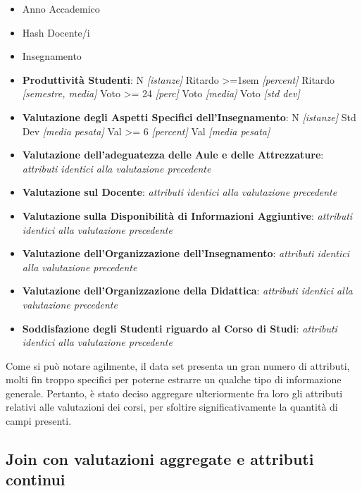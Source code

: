 		\begin{itemize}
			\item Anno Accademico
			\item Hash Docente/i
			\item Insegnamento
			\item \textbf{Produttività Studenti}:
				\subitem N \textit{[istanze]}
				\subitem Ritardo >=1sem \textit{[percent]}
				\subitem Ritardo \textit{[semestre, media]}
				\subitem Voto >= 24 \textit{[perc]}
				\subitem Voto \textit{[media]}
				\subitem Voto \textit{[std dev]}
			\item \textbf{Valutazione degli Aspetti Specifici dell'Insegnamento}:
				\subitem N \textit{[istanze]}
				\subitem Std Dev \textit{[media pesata]}
				\subitem Val >= 6 \textit{[percent]}
				\subitem Val \textit{[media pesata]}
			\item \textbf{Valutazione dell'adeguatezza delle Aule e delle Attrezzature}:
				\subitem \textit{attributi identici alla valutazione precedente}
			\item \textbf{Valutazione sul Docente}:
				\subitem \textit{attributi identici alla valutazione precedente}
			\item \textbf{Valutazione sulla Disponibilità di Informazioni Aggiuntive}:
				\subitem \textit{attributi identici alla valutazione precedente}
			\item \textbf{Valutazione dell'Organizzazione dell'Insegnamento}:
				\subitem \textit{attributi identici alla valutazione precedente}
			\item \textbf{Valutazione dell'Organizzazione della Didattica}:
				\subitem \textit{attributi identici alla valutazione precedente}
			\item \textbf{Soddisfazione degli Studenti riguardo al Corso di Studi}:
				\subitem \textit{attributi identici alla valutazione precedente}
		\end{itemize}

		Come si può notare agilmente, il data set presenta un gran numero di attributi, molti fin troppo specifici per poterne estrarre un qualche tipo di informazione generale. Pertanto, è stato deciso aggregare ulteriormente fra loro gli attributi relativi alle valutazioni dei corsi, per sfoltire significativamente la quantità di campi presenti.
		
	\subsection{Join con valutazioni aggregate e attributi continui}

